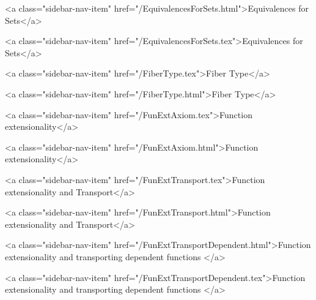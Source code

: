       
    
      
        
          <a class="sidebar-nav-item" href="/EquivalencesForSets.html">Equivalences for Sets</a>
        
      
    
      
        
          <a class="sidebar-nav-item" href="/EquivalencesForSets.tex">Equivalences for Sets</a>
        
      
    
      
        
          <a class="sidebar-nav-item" href="/FiberType.tex">Fiber Type</a>
        
      
    
      
        
          <a class="sidebar-nav-item" href="/FiberType.html">Fiber Type</a>
        
      
    
      
        
          <a class="sidebar-nav-item" href="/FunExtAxiom.tex">Function extensionality</a>
        
      
    
      
        
          <a class="sidebar-nav-item" href="/FunExtAxiom.html">Function extensionality</a>
        
      
    
      
        
          <a class="sidebar-nav-item" href="/FunExtTransport.tex">Function extensionality and Transport</a>
        
      
    
      
        
          <a class="sidebar-nav-item" href="/FunExtTransport.html">Function extensionality and Transport</a>
        
      
    
      
        
          <a class="sidebar-nav-item" href="/FunExtTransportDependent.html">Function extensionality and transporting dependent functions </a>
        
      
    
      
        
          <a class="sidebar-nav-item" href="/FunExtTransportDependent.tex">Function extensionality and transporting dependent functions </a>
        
      
    
